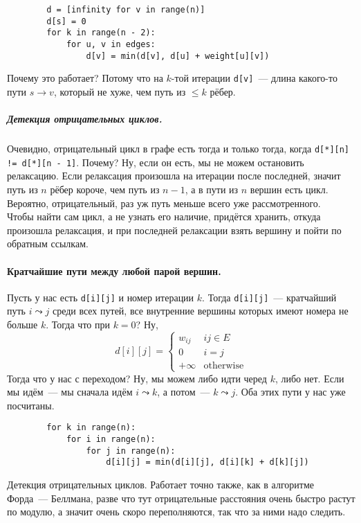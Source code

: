 \documentclass{article}
\begin{document}
    \begin{verbatim}
        d = [infinity for v in range(n)]
        d[s] = 0
        for k in range(n - 2):
            for u, v in edges:
                d[v] = min(d[v], d[u] + weight[u][v])
    \end{verbatim}
    Почему это работает? Потому что на $k$-той итерации \texttt{d[v]}~--- длина какого-то пути $s\to v$, который не хуже, чем путь из $\leqslant k$ рёбер.
    \subparagraph{Детекция отрицательных циклов.}
    Очевидно, отрицательный цикл в графе есть тогда и только тогда, когда \texttt{d[*][n] != d[*][n - 1]}. Почему? Ну, если он есть, мы не можем остановить релаксацию. Если релаксация произошла на итерации после последней, значит путь из $n$ рёбер короче, чем путь из $n-1$, а в пути из $n$ вершин есть цикл. Вероятно, отрицательный, раз уж путь меньше всего уже рассмотренного.\\
    Чтобы найти сам цикл, а не узнать его наличие, придётся хранить, откуда произошла релаксация, и при последней релаксации взять вершину и пойти по обратным ссылкам.
    \paragraph{Кратчайшие пути между любой парой вершин.}
    Пусть у нас есть \texttt{d[i][j]} и номер итерации $k$. Тогда \texttt{d[i][j]}~--- кратчайший путь $i\leadsto j$ среди всех путей, все внутренние вершины которых имеют номера не больше $k$. Тогда что при $k=0$? Ну,
    $$
        d[i][j]=\begin{cases}
            w_{ij}&ij\in E\\
            0&i=j\\
            +\infty&\mathrm{otherwise}
        \end{cases}
    $$
    Тогда что у нас с переходом? Ну, мы можем либо идти черед $k$, либо нет. Если мы идём~--- мы сначала идём $i\leadsto k$, а потом~--- $k\leadsto j$. Оба этих пути у нас уже посчитаны.
    \begin{verbatim}
        for k in range(n):
            for i in range(n):
                for j in range(n):
                    d[i][j] = min(d[i][j], d[i][k] + d[k][j])
    \end{verbatim}
    Детекция отрицательных циклов. Работает точно также, как в алгоритме Форда~--- Беллмана, разве что тут отрицательные расстояния очень быстро растут по модулю, а значит очень скоро переполняются, так что за ними надо следить.
\end{document}
